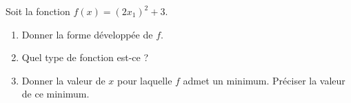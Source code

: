 
\begin{exercice}\label{exosmath-0270}

    Soit la fonction \( f(x)=(2x_1)^2+3\).
    \begin{enumerate}
        \item
            Donner la forme développée de \( f\).
        \item
            Quel type de fonction est-ce ?
        \item
            Donner la valeur de \( x\) pour laquelle \( f\) admet un minimum. Préciser la valeur de ce minimum.
    \end{enumerate}

\end{exercice}
